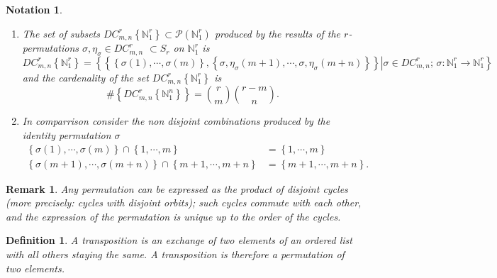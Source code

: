 \documentclass[aps,preprint]{revtex4}%
\newtheorem{definition}[theorem]{Definition}
\newtheorem{notation}[theorem]{Notation}
\newtheorem{remark}[theorem]{Remark}
\begin{document}
\begin{notation}
\begin{enumerate}
\item The set of subsets $DC_{m,n}^{r}\left\{  \mathbb{N}_{1}^{r}\right\}
\subset\mathcal{P}\left(  \mathbb{N}_{1}^{r}\right)  $ produced by the results
of the $r$-permutations $\sigma,\eta_{\sigma}\in DC_{m,n}^{r}$ $\subset S_{r}$
on $\mathbb{N}_{1}^{r}$ is%
\begin{equation}
DC_{m,n}^{r}\left\{  \mathbb{N}_{1}^{r}\right\}  =\left\{  \left.  \left\{
\left\{  \sigma\left(  1\right)  ,\cdots,\sigma\left(  m\right)  \right\}
,\left\{  \sigma,\eta_{\sigma}\left(  m+1\right)  ,\cdots,\sigma,\eta_{\sigma
}\left(  m+n\right)  \right\}  \right\}  \right\vert \sigma\in DC_{m,n}%
^{r};\,\sigma:\mathbb{N}_{1}^{r}\rightarrow\mathbb{N}_{1}^{r}\right\}
\end{equation}
and the cardenality of the set $DC_{m,n}^{r}\left\{  \mathbb{N}_{1}%
^{r}\right\}  $ is
\begin{equation}
\#\left\{  DC_{m,n}^{r}\left\{  \mathbb{N}_{1}^{n}\right\}  \right\}
=\binom{r}{m}\binom{r-m}{n}.
\end{equation}


\item In comparrison consider the \emph{non disjoint} combinations produced by
the identity permutation $\sigma$
\begin{align}
\left\{  \sigma\left(  1\right)  ,\cdots,\sigma\left(  m\right)  \right\}
\cap\left\{  1,\cdots,m\right\}   &  =\left\{  1,\cdots,m\right\} \\
\left\{  \sigma\left(  m+1\right)  ,\cdots,\sigma\left(  m+n\right)  \right\}
\cap\left\{  m+1,\cdots,m+n\right\}   &  =\left\{  m+1,\cdots,m+n\right\}  .
\end{align}

\end{enumerate}
\end{notation}

\begin{remark}
Any permutation can be expressed as the product of \emph{disjoint}
\emph{cycles} (more precisely: cycles with \emph{disjoint orbits}); such
cycles commute with each other, and the expression of the permutation is
unique up to the order of the cycles.
\end{remark}

\begin{definition}
A \emph{transposition} is an exchange of two elements of an ordered list with
all others staying the same. A transposition is therefore a permutation of two elements.
\end{definition}
\end{document}
